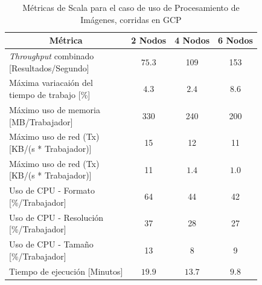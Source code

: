 \documentclass[11pt]{article}
\providecommand{\row}[1]{\parbox{150pt}{\setlength{\baselineskip}{0.2\baselineskip}\strut#1\strut}}
\newcommand{\ipcap}[2]{\caption{Métricas de #1 para el caso de uso de Procesamiento de Imágenes, corridas en #2}}
\newcommand{\english}[1]{\textit{#1}}
\begin{document}
\begin{table}[H]
\centering
\begin{tabular}{|l|c|c|c|}
\hline
\multicolumn{1}{|c|}{Métrica} & 2 Nodos & 4 Nodos & 6 Nodos \\ \hline
\row{\english{Throughput} combinado\\{[Resultados/Segundo]}} & $75.3$ & 109 & 153 \\ \hline
\row{Máxima variacaión del \\ tiempo de trabajo {[}\%{]}} & $4.3$ & $2.4$ & $8.6$ \\ \hline
\row{Máximo uso de memoria \\ {[MB/Trabajador]}} & 330 & 240 & 200 \\ \hline
\row{Máximo uso de red (Tx) \\ {[KB/(s * Trabajador)]}} & 15 & 12 & 11 \\ \hline
\row{Máximo uso de red (Tx) \\ {[KB/(s * Trabajador)]}} & 11 & $1.4$ & $1.0$ \\ \hline
\row{Uso de CPU - Formato\\{[\%/Trabajador]}} & 64 & 44 & 42 \\ \hline
\row{Uso de CPU - Resolución\\{[\%/Trabajador]}} & 37 & 28 & 27 \\ \hline
\row{Uso de CPU - Tamaño\\{[\%/Trabajador]}} & 13 & 8 & 9 \\ \hline
Tiempo de ejecución [Minutos] & $19.9$ & $13.7$ & $9.8$ \\ \hline
\end{tabular}
\ipcap{Scala}{GCP}
\end{table}
\end{document}
